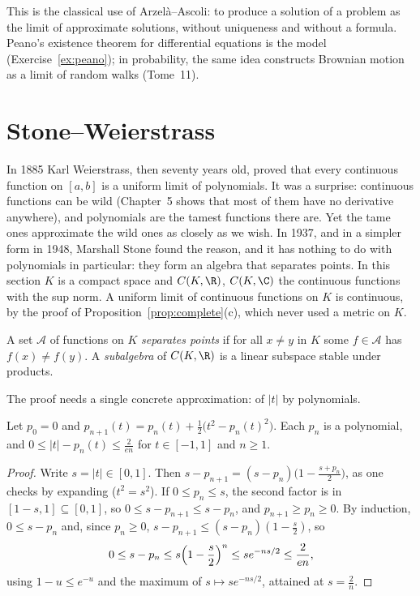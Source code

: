 This is the classical use of Arzel\`a--Ascoli: to produce a solution of a problem as the limit of approximate solutions, without uniqueness and
without a formula. Peano's existence theorem for differential equations is the model (Exercise~\ref{ex:peano}); in probability, the same idea
constructs Brownian motion as a limit of random walks (Tome~11).

\section{Stone--Weierstrass}

In 1885 Karl Weierstrass, then seventy years old, proved that every continuous function on $[a,b]$ is a uniform limit of polynomials. It
was a surprise: continuous functions can be wild (Chapter~5 shows that most of them have no derivative anywhere), and polynomials are the
tamest functions there are. Yet the tame ones approximate the wild ones as closely as we wish. In 1937, and in a simpler form in 1948,
Marshall Stone found the reason, and it has nothing to do with polynomials in particular: they form an algebra that separates points. In this section $K$ is a compact space and $C(K,\R)$, $C(K,\C)$ the continuous functions
with the sup norm. A uniform limit of continuous functions on $K$ is continuous, by the proof of Proposition~\ref{prop:complete}(c), which never used a
metric on $K$.

\begin{definition}
A set $\mathcal A$ of functions on $K$ \emph{separates points} if for all $x\ne y$ in $K$ some $f\in\mathcal A$ has $f(x)\ne f(y)$. A \emph{subalgebra} of $C(K,\R)$ is a linear subspace
stable under products.
\end{definition}

The proof needs a single concrete approximation: of $|t|$ by polynomials.

\begin{lemma}\label{lem:abs}
Let $p_0=0$ and $p_{n+1}(t)=p_n(t)+\frac12\bigl(t^2-p_n(t)^2\bigr)$. Each $p_n$ is a polynomial, and $0\le|t|-p_n(t)\le\frac2{en}$ for $t\in[-1,1]$ and $n\ge1$.
\end{lemma}
\begin{proof}
Write $s=|t|\in[0,1]$. Then $s-p_{n+1}=(s-p_n)\bigl(1-\frac{s+p_n}2\bigr)$, as one checks by expanding ($t^2=s^2$). If $0\le p_n\le s$, the second factor is in
$[1-s,1]\subseteq[0,1]$, so $0\le s-p_{n+1}\le s-p_n$, and $p_{n+1}\ge p_n\ge0$. By induction, $0\le s-p_n$ and, since $p_n\ge0$, $s-p_{n+1}\le(s-p_n)(1-\frac s2)$, so
\[0\le s-p_n\le s\Bigl(1-\frac s2\Bigr)^n\le se^{-ns/2}\le\frac2{en},\]
using $1-u\le e^{-u}$ and the maximum of $s\mapsto se^{-ns/2}$, attained at $s=\frac2n$.
\end{proof}


